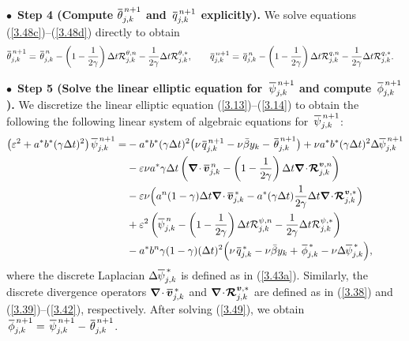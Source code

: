\documentclass[a4paper,11pt,twoside]{article}
\numberwithin{equation}{section}
\numberwithin{figure}{section}
\numberwithin{table}{section}
\newcommand{\bnabla}{\bm{\nabla}}
\newcommand{\eps}{\varepsilon}
\newcommand{\dt}{\Delta t}
\newcommand{\bv}{\bm{v}}
\newcommand\eref[1]{(\ref{#1})}
\newcommand*\xbar[1]{%
	\hbox{%
		\vbox{%
			\hrule height 0.5pt %
			\kern0.3ex%
			\hbox{%
				\kern-0.05em%
				\ensuremath{#1}%
				\kern-0.02em%
			}%
		}%
	}%
}
\begin{document}
\smallskip
\noindent
$\bullet\,$ \textbf{Step 4 (Compute $\xbar\theta^{\,n+1}_{j,k}$ and $\,\xbar q^{\,n+1}_{j,k}$ explicitly).} We solve equations
\eref{3.48c}--\eref{3.48d} directly to obtain
\begin{equation*}
\begin{aligned}
&\xbar\theta^{\,n+1}_{j,k}=\,\xbar\theta^{\,n}_{j,k}-\left(1-\frac{1}{2\gamma}\right)\dt{\cal R}^{\theta,n}_{j,k}-
\frac{1}{2\gamma}\dt{\cal R}^{\theta,*}_{j,k},\qquad
\xbar q^{\,n+1}_{j,k}=\,\xbar q^{\,n}_{j,k}-\left(1-\frac{1}{2\gamma}\right)\dt{\cal R}^{q,n}_{j,k}-
\frac{1}{2\gamma}\dt{\cal R}^{q,*}_{j,k}.
\end{aligned}
\end{equation*}

\smallskip
\noindent
$\bullet\,$ \textbf{Step 5 (Solve the linear elliptic equation for $\,\xbar\psi^{\,n+1}_{j,k}$ and compute $\,\xbar{\phi}^{\,n+1}_{j,k}$).}
We discretize the linear elliptic equation \eref{3.13}--\eref{3.14} to obtain the following the following linear system of algebraic
equations for $\,\xbar\psi^{\,n+1}_{j,k}$:
\begin{equation}
\begin{aligned}
\big(\eps^2+a^*b^*(\gamma\dt)^2\big)\,\xbar\psi^{\,n+1}_{j,k}=&-a^*b^*(\gamma\dt)^2\big(\nu\,\xbar q^{\,n+1}_{j,k}-\nu\bar{\beta}y_k
-\,\xbar\theta^{\,n+1}_{j,k}\big)+\nu a^*b^*(\gamma\dt)^2\Delta\xbar\psi^{\,n+1}_{j,k}\\
&-\eps\nu a^*\gamma\dt\left(\bnabla\!\cdot\xbar{\bv}^{\,n}_{j,k}-
\left(1-\frac{1}{2\gamma}\right)\dt\bnabla\!\cdot\!\bm{{\cal R}}^{\bv,n}_{j,k}\right)\\
&-\eps\nu\Big(a^n(1-\gamma)\dt\bnabla\!\cdot\xbar{\bv}^{\,*}_{j,k}-
a^*(\gamma\dt)\frac{1}{2\gamma}\dt\bnabla\!\cdot\!\bm{{\cal R}}^{\bv,*}_{j,k}\Big)\\
&+\eps^2\left(\xbar\psi^{\,n}_{j,k}-\left(1-\frac{1}{2\gamma}\right)\dt{\cal R}^{\psi,n}_{j,k}-\frac{1}{2\gamma}\dt{\cal R}^{\psi,*}_{j,k}
\right)\\
&-a^*b^n\gamma(1-\gamma)(\dt)^2\Big(\nu\,\xbar q^{\,*}_{j,k}-\nu\bar{\beta}y_k+\,\xbar{\phi}^{\,*}_{j,k}-\nu\Delta\xbar\psi^{\,*}_{j,k}
\Big),
\end{aligned}
\label{3.49}
\end{equation}
where the discrete Laplacian $\Delta\xbar\psi^{\,*}_{j,k}$ is defined as in \eref{3.43a}. Similarly, the discrete divergence operators
$\bnabla\!\cdot\xbar{\bv}^{\,*}_{j,k}$ and $\bnabla\!\cdot\!\bm{{\cal R}}^{\bv,*}_{j,k}$ are defined as in \eref{3.38} and
\eref{3.39}--\eref{3.42}, respectively. After solving \eref{3.49}, we obtain
$\,\xbar{\phi}^{\,n+1}_{j,k}=\,\xbar\psi^{\,n+1}_{j,k}-\,\xbar\theta^{\,n+1}_{j,k}$.
\end{document}
